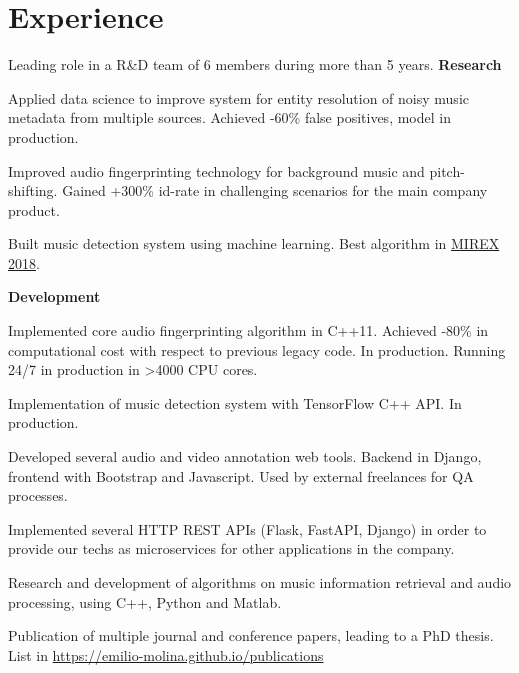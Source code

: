 \documentclass[]{deedy-resume-openfont}
\begin{document}
\begin{minipage}[t]{0.66\textwidth} 


\section{Experience}
\vspace{0.1cm}
Leading role in a R\&D team of 6 members during more than 5 years.
\vspace{0.1cm}
\break
\textbf{Research}
\vspace{\topsep} %
\begin{tightemize}
\item Applied data science to improve system for entity resolution of noisy music metadata from multiple sources. Achieved -60\% false positives, model in production.
\item Improved audio fingerprinting technology for background music and pitch-shifting. Gained +300\% id-rate in challenging scenarios for the main company product.
\item Built music detection system using machine learning. Best algorithm in \href{https://www.music-ir.org/mirex/wiki/2018:Music_and_or_Speech_Detection_Results}{MIREX 2018}.
\end{tightemize}
\textbf{Development}
\begin{tightemize}
\item Implemented core audio fingerprinting algorithm in C++11. Achieved -80\% in computational cost with respect to previous legacy code. In production. Running 24/7 in production in >4000 CPU cores.
\item Implementation of music detection system with TensorFlow C++ API. In production.
\item Developed several audio and video annotation web tools. Backend in Django, frontend with Bootstrap and Javascript. Used by external freelances for QA processes.
\item Implemented several HTTP REST APIs (Flask, FastAPI, Django) in order to provide our techs as microservices for other applications in the company.
\end{tightemize}
\sectionsep

\begin{tightemize}
\item Research and development of algorithms on music information retrieval and audio processing, using C++, Python and Matlab.
\item Publication of multiple journal and conference papers, leading to a PhD thesis. List in \href{https://emilio-molina.github.io/publications}{https://emilio-molina.github.io/publications}
\end{tightemize}
\sectionsep


\end{minipage}
\end{document}
